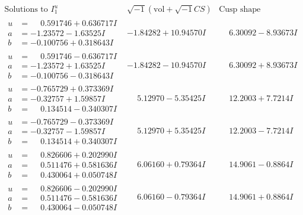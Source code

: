 \documentclass[1p]{elsarticle_modified}
\theoremstyle{definition}
\newcommand{\I}{\sqrt{-1}}
\begin{document}
$$\begin{array}{c|c|c}  
\text{Solutions to }I^u_{1}& \I (\text{vol} + \sqrt{-1}CS) & \text{Cusp shape}\\
 \hline 
\begin{aligned}
u &= \phantom{-}0.591746 + 0.636717 I \\
a &= -1.23572 - 1.63525 I \\
b &= -0.100756 + 0.318643 I\end{aligned}
 & -1.84282 + 10.94570 I & \phantom{-}6.30092 - 8.93673 I \\ \hline\begin{aligned}
u &= \phantom{-}0.591746 - 0.636717 I \\
a &= -1.23572 + 1.63525 I \\
b &= -0.100756 - 0.318643 I\end{aligned}
 & -1.84282 - 10.94570 I & \phantom{-}6.30092 + 8.93673 I \\ \hline\begin{aligned}
u &= -0.765729 + 0.373369 I \\
a &= -0.32757 + 1.59857 I \\
b &= \phantom{-}0.134514 - 0.340307 I\end{aligned}
 & \phantom{-}5.12970 - 5.35425 I & \phantom{-}12.2003 + 7.7214 I \\ \hline\begin{aligned}
u &= -0.765729 - 0.373369 I \\
a &= -0.32757 - 1.59857 I \\
b &= \phantom{-}0.134514 + 0.340307 I\end{aligned}
 & \phantom{-}5.12970 + 5.35425 I & \phantom{-}12.2003 - 7.7214 I \\ \hline\begin{aligned}
u &= \phantom{-}0.826606 + 0.202990 I \\
a &= \phantom{-}0.511476 + 0.581636 I \\
b &= \phantom{-}0.430064 + 0.050748 I\end{aligned}
 & \phantom{-}6.06160 + 0.79364 I & \phantom{-}14.9061 - 0.8864 I \\ \hline\begin{aligned}
u &= \phantom{-}0.826606 - 0.202990 I \\
a &= \phantom{-}0.511476 - 0.581636 I \\
b &= \phantom{-}0.430064 - 0.050748 I\end{aligned}
 & \phantom{-}6.06160 - 0.79364 I & \phantom{-}14.9061 + 0.8864 I \\ \hline\begin{aligned}

\end{aligned}
\end{array}$$
\end{document}

